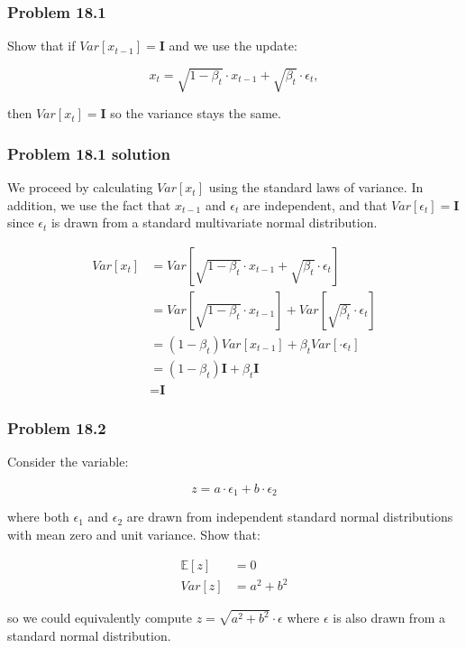 \documentclass[
10pt, %
a4paper, %
oneside, %
headinclude,footinclude, %
BCOR5mm, %
]{scrartcl}
\begin{document}
\subsubsection*{Problem 18.1}

Show that if $Var[x_{t-1}] = \textbf{I}$ and we use the update:

\begin{equation*}
  x_t = \sqrt{1-\beta_t}\cdot x_{t-1} + \sqrt{\beta_t} \cdot \epsilon_t,
\end{equation*}

then $Var[x_t] = \textbf{I}$ so the variance stays the same.

\subsubsection*{Problem 18.1 solution}

We proceed by calculating $Var[x_t]$ using the standard laws of variance. In addition, we use the fact that $x_{t-1}$ and $\epsilon_t$ are independent, and that $Var[\epsilon_t] = \textbf{I}$ since $\epsilon_t$ is drawn from a standard multivariate normal distribution.

\begin{align*}
  Var[x_t] &= Var[\sqrt{1-\beta_t}\cdot x_{t-1} + \sqrt{\beta_t} \cdot \epsilon_t] \\
  &= Var[\sqrt{1-\beta_t}\cdot x_{t-1}] + Var[\sqrt{\beta_t} \cdot \epsilon_t] \\
  &= (1-\beta_t) Var[x_{t-1}] + \beta_t Var[ \cdot \epsilon_t] \\
  &= (1-\beta_t) \textbf{I} + \beta_t \textbf{I} \\
  &= \textbf{I}
\end{align*}

\subsubsection*{Problem 18.2}

Consider the variable:

$$z = a \cdot \epsilon_1 + b \cdot \epsilon_2$$

where both $\epsilon_1$ and $\epsilon_2$ are drawn from independent standard normal distributions with mean zero and unit variance. Show that:

\begin{align*}
  \mathbb{E}[z] &= 0 \\
  Var[z] &= a^2 + b^2
\end{align*}

so we could equivalently compute $z = \sqrt{a^2 + b^2} \cdot \epsilon$ where $\epsilon$ is also drawn from a standard normal distribution.


\end{document}
